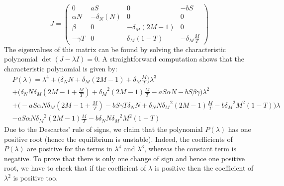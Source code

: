 \documentclass[a4paper, 12pt]{article}
\begin{document}
\[
J = \begin{pmatrix}
0 & aS & 0 & -bS \\
\alpha N &  - \delta_N (N) & 0 & 0 \\
\beta & 0 & -\delta_M (2M-1) & 0 \\
-\gamma T & 0 & \delta_M (1-T) & - \delta_M\frac{M}{T} 
\end{pmatrix}
\]
The eigenvalues of this matrix can be found by solving the characteristic polynomial $\det(J - \lambda I) = 0$. A straightforward computation shows that the characteristic polynomial is given by:
\begin{eqnarray*}
&P(\lambda) = \lambda^4 + \Big(\delta_N N + \delta_M (2M-1) + \delta_M \frac{M}{T}\Big) \lambda^3 \\
&+ \Big(\delta_N N \delta_M(2M-1 + \frac{M}{T}) + {\delta_M}^2 (2M-1)\frac{M}{T} -a S \alpha N - b S \beta \gamma \Big) \lambda^2 \\
&+ \Big(- a S \alpha N \delta_M (2M-1+\frac{M}{T})  - b S\gamma T\delta_N N + \delta_N N {\delta_M}^2(2M-1)\frac{M}{T}- b{\delta_M}^2 M^2(1-T)\Big) \lambda \\
&- a S \alpha N {\delta_M}^2 (2M-1) \frac{M}{T} - b \delta_N N {\delta_M}^2 M^2 (1-T)
\end{eqnarray*}
Due to the Descartes' rule of signs, we claim that the polynomial $P(\lambda)$ has one positive root (hence the equilibrium is unstable). Indeed, the coefficients of $P(\lambda)$ are positive for the terms in 
$\lambda^4$ and $\lambda^3$, whereas the constant term is negative. To prove that there is only one change of sign and hence one positive root, we have to check that if the coefficient of $\lambda$ is positive then the coefficient of 
$\lambda^2$ is positive too. 
\end{document}
